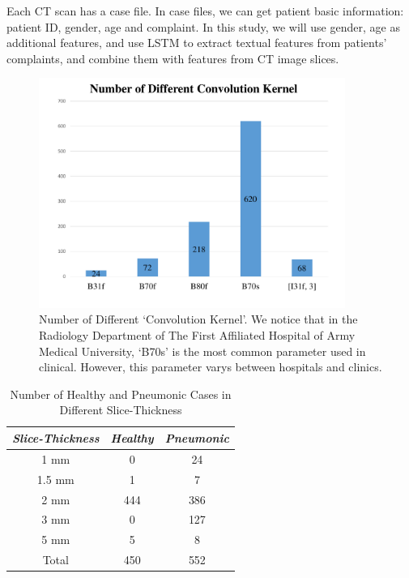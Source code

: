 \documentclass[journal]{IEEEtran}
\begin{document}
Each CT scan has a case file. In case files, we can get patient basic information: patient ID, gender, age and complaint. In this study, we will use gender, age as additional features, and use LSTM to extract textual features from patients' complaints, and combine them with features from CT image slices.

\begin{figure}[t]
\centerline{\includegraphics[width=100mm]{NumberofDifferentConvolutionKernel.pdf}}
\vspace{-0cm}
\caption{Number of Different `Convolution Kernel'. We notice that in the Radiology Department of The First Affiliated Hospital of Army Medical University, `B70s' is the most common parameter used in clinical. However, this parameter varys between hospitals and clinics.}
\vspace{-0cm}
\label{NumberofDifferentConvolutionKernel}
\end{figure}


\begin{table}[htb]
\vspace{-0cm}
\caption{Number of Healthy and Pneumonic Cases in Different Slice-Thickness}
\vspace{-0cm}
\begin{center}
\begin{tabular}{|c|c|c|}
\hline
\textbf{\textit{Slice-Thickness}}& \textbf{\textit{Healthy}}& \textbf{\textit{Pneumonic}}  \\
\hline
1 mm & 0 & 24 \\
1.5 mm  & 1 & 7\\
2 mm & 444 & 386  \\
3 mm & 0 & 127  \\
5 mm & 5 & 8  \\
\hline
Total & 450 & 552 \\
\hline
\end{tabular}
\vspace{-0cm}
\label{distributionofhealthyandpneumonic}
\end{center}
\vspace{-0cm}
\end{table}
\end{document}
